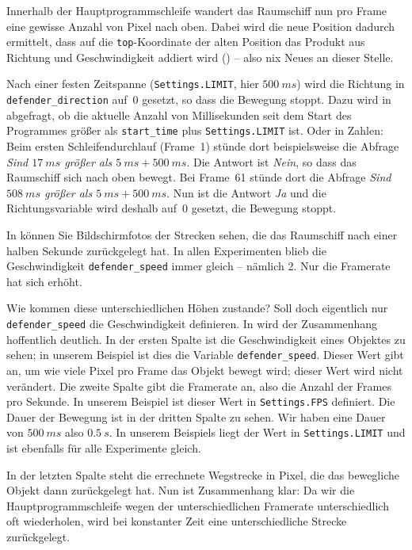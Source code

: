 Innerhalb der Hauptprogrammschleife wandert das Raumschiff nun pro Frame eine gewisse Anzahl von Pixel nach oben. Dabei wird die neue Position dadurch ermittelt, dass auf die \texttt{top}-Koordinate der alten Position das Produkt aus Richtung und Geschwindigkeit addiert wird () -- also nix Neues an dieser Stelle.

Nach einer festen Zeitspanne (\texttt{Settings.LIMIT}, hier $500~ms$) wird die Richtung in \texttt{defender\_direction} auf~0 gesetzt, so dass die Bewegung stoppt. Dazu wird in  abgefragt, ob die aktuelle Anzahl von Millisekunden seit dem Start des Programmes größer als \texttt{start\_time} plus \texttt{Settings.LIMIT} ist. Oder in Zahlen: Beim ersten Schleifendurchlauf (Frame~1) stünde dort beispielsweise die Abfrage \emph{Sind $17~ms$ größer als $5~ms + 500~ms$}. Die Antwort ist \emph{Nein}, so dass das Raumschiff sich nach oben bewegt. Bei Frame~61 stünde dort die Abfrage \emph{Sind $508~ms$ größer als $5~ms + 500~ms$}. Nun ist die Antwort \emph{Ja} und die Richtungsvariable wird deshalb auf~0 gesetzt, die Bewegung stoppt.


In  können Sie Bildschirmfotos der Strecken sehen, die das Raumschiff nach einer halben Sekunde zurückgelegt hat. In allen Experimenten blieb die Geschwindigkeit \texttt{defender\_speed} immer gleich -- nämlich 2. Nur die Framerate hat sich erhöht.

Wie kommen diese unterschiedlichen Höhen zustande? Soll doch eigentlich nur \texttt{de\-fen\-der\-\_speed} die Geschwindigkeit definieren. In  wird der Zusammenhang hoffentlich deutlich. In der ersten Spalte ist die Geschwindigkeit eines Objektes zu sehen; in unserem Beispiel ist dies die Variable \texttt{defender\_speed}. Dieser Wert gibt an, um wie viele Pixel pro Frame das Objekt bewegt wird; dieser Wert wird nicht verändert. Die zweite Spalte gibt die Framerate an, also die Anzahl der Frames pro Sekunde. In unserem Beispiel ist dieser Wert in \texttt{Settings.FPS} definiert. Die Dauer der Bewegung ist in der dritten Spalte zu sehen. Wir haben eine Dauer von $500~ms$ also $0.5~s$. In unserem Beispiels liegt der Wert in \texttt{Settings.LIMIT} und ist ebenfalls für alle Experimente gleich. 

In der letzten Spalte steht die errechnete Wegstrecke in Pixel, die das bewegliche Objekt dann zurückgelegt hat. Nun ist Zusammenhang klar: Da wir die Hauptprogrammschleife wegen der unterschiedlichen Framerate unterschiedlich oft wiederholen, wird bei konstanter Zeit eine unterschiedliche Strecke zurückgelegt.

